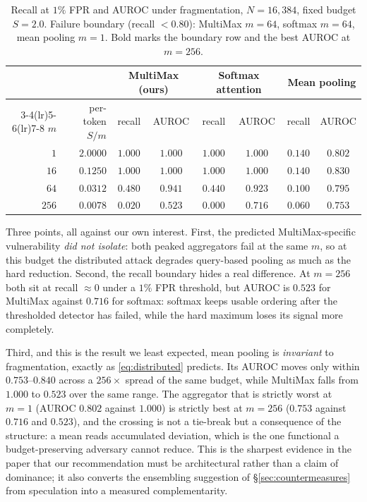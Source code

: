 \documentclass[10pt]{article}
\theoremstyle{plain}
\theoremstyle{definition}
\theoremstyle{remark}
\begin{document}
\begin{table}[!ht]
\centering\small
\begin{tabular}{rrcccccc}
\toprule
& & \multicolumn{2}{c}{MultiMax (ours)} & \multicolumn{2}{c}{Softmax attention}
  & \multicolumn{2}{c}{Mean pooling}\\
\cmidrule(lr){3-4}\cmidrule(lr){5-6}\cmidrule(lr){7-8}
$m$ & per-token $S/m$ & recall & AUROC & recall & AUROC & recall & AUROC\\
\midrule
$1$   & $2.0000$ & $1.000$ & $1.000$ & $1.000$ & $1.000$ & $0.140$ & $0.802$\\
$16$  & $0.1250$ & $1.000$ & $1.000$ & $1.000$ & $1.000$ & $0.140$ & $0.830$\\
$64$  & $0.0312$ & $\mathbf{0.480}$ & $0.941$ & $\mathbf{0.440}$ & $0.923$
                 & $0.100$ & $0.795$\\
$256$ & $0.0078$ & $0.020$ & $0.523$ & $0.000$ & $0.716$ & $0.060$ & $\mathbf{0.753}$\\
\bottomrule
\end{tabular}
\caption{Recall at $1\%$ FPR and AUROC under fragmentation, $N{=}16{,}384$, fixed budget
$S{=}2.0$. Failure boundary (recall $<0.80$): MultiMax $m{=}64$, softmax $m{=}64$, mean
pooling $m{=}1$. Bold marks the boundary row and the best AUROC at $m{=}256$.}
\label{tab:distributed}
\end{table}

Three points, all against our own interest. First, the predicted MultiMax-specific
vulnerability \emph{did not isolate}: both peaked aggregators fail at the same $m$, so at
this budget the distributed attack degrades query-based pooling as much as the hard
reduction. Second, the recall boundary hides a real difference. At $m{=}256$ both sit at
recall $\approx0$ under a $1\%$ FPR threshold, but AUROC is $0.523$ for MultiMax against
$0.716$ for softmax: softmax keeps usable ordering after the thresholded detector has
failed, while the hard maximum loses its signal more completely.

Third, and this is the result we least expected, mean pooling is \emph{invariant} to
fragmentation, exactly as \eqref{eq:distributed} predicts. Its AUROC moves only within
$0.753$--$0.840$ across a $256\times$ spread of the same budget, while MultiMax falls from
$1.000$ to $0.523$ over the same range. The aggregator that is strictly worst at $m{=}1$
(AUROC $0.802$ against $1.000$) is strictly best at $m{=}256$ ($0.753$ against $0.716$ and
$0.523$), and the crossing is not a tie-break but a consequence of the structure: a mean
reads accumulated deviation, which is the one functional a budget-preserving adversary
cannot reduce. This is the sharpest evidence in the paper that our recommendation must be
architectural rather than a claim of dominance; it also converts the ensembling suggestion
of \S\ref{sec:countermeasures} from speculation into a measured complementarity.
\end{document}

